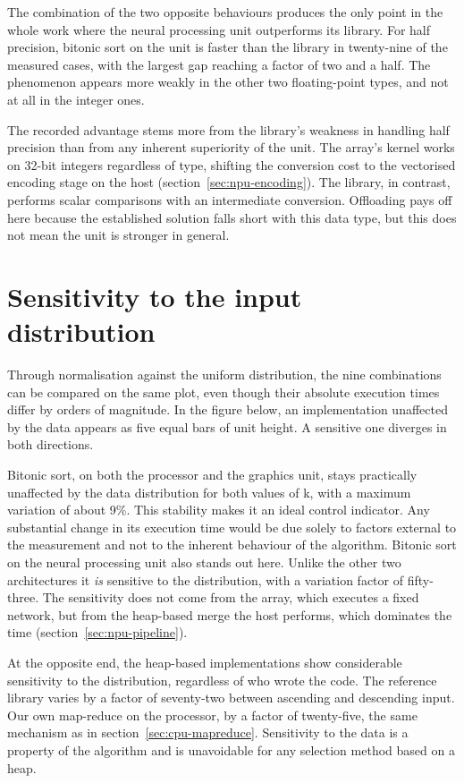 The combination of the two opposite behaviours produces the only point in the
whole work where the neural processing unit outperforms its library. For half
precision, bitonic sort on the unit is faster than the library in twenty-nine
of the measured cases, with the largest gap reaching a factor of two and a
half. The phenomenon appears more weakly in the other two floating-point types,
and not at all in the integer ones.

The recorded advantage stems more from the library's weakness in handling half
precision than from any inherent superiority of the unit. The array's kernel
works on 32-bit integers regardless of type, shifting the conversion cost to
the vectorised encoding stage on the host (section~\ref{sec:npu-encoding}). The
library, in contrast, performs scalar comparisons with an intermediate
conversion. Offloading pays off here because the established solution falls
short with this data type, but this does not mean the unit is stronger in
general.

\section{Sensitivity to the input distribution}
\label{sec:eval-distributions}

Through normalisation against the uniform distribution, the nine combinations
can be compared on the same plot, even though their absolute execution times
differ by orders of magnitude. In the figure below, an implementation
unaffected by the data appears as five equal bars of unit height. A sensitive
one diverges in both directions.

Bitonic sort, on both the processor and the graphics unit, stays practically
unaffected by the data distribution for both values of k, with a maximum
variation of about 9\%. This stability makes it an ideal control indicator. Any
substantial change in its execution time would be due solely to factors
external to the measurement and not to the inherent behaviour of the algorithm.
Bitonic sort on the neural processing unit also stands out here. Unlike the
other two architectures it \emph{is} sensitive to the distribution, with a
variation factor of fifty-three. The sensitivity does not come from the array,
which executes a fixed network, but from the heap-based merge the host
performs, which dominates the time (section~\ref{sec:npu-pipeline}).

At the opposite end, the heap-based implementations show considerable
sensitivity to the distribution, regardless of who wrote the code. The
reference library varies by a factor of seventy-two between ascending and
descending input. Our own map-reduce on the processor, by a factor of
twenty-five, the same mechanism as in section~\ref{sec:cpu-mapreduce}.
Sensitivity to the data is a property of the algorithm and is unavoidable for
any selection method based on a heap.

